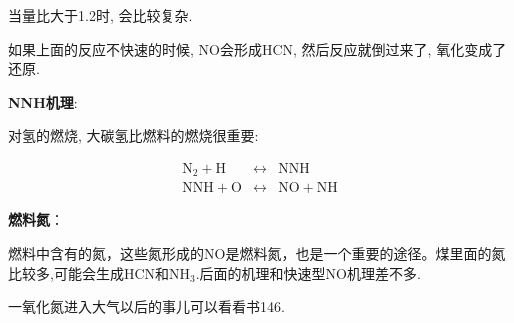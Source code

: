 当量比大于1.2时, 会比较复杂.

如果上面的反应不快速的时候, NO会形成HCN, 然后反应就倒过来了, 氧化变成了还原.

\textbf{NNH机理}: 

对氢的燃烧, 大碳氢比燃料的燃烧很重要:

\begin{eqnarray}
    \mathrm{N_2 + H} &\leftrightarrow& \mathrm{NNH}\\
    \mathrm{NNH + O} &\leftrightarrow& \mathrm{NO + NH}
\end{eqnarray}

\textbf{燃料氮}：

燃料中含有的氮，这些氮形成的NO是燃料氮，也是一个重要的途径。煤里面的氮比较多,可能会生成HCN和NH\(_3\).后面的机理和快速型NO机理差不多.

一氧化氮进入大气以后的事儿可以看看书146.
